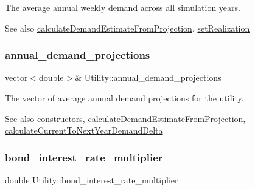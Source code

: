 The average annual weekly demand across all simulation years. 

\begin{DoxySeeAlso}{See also}
\mbox{\hyperlink{classUtility_a10f96b2f34ba7e6e12a8e8fb98b8534a}{calculate\+Demand\+Estimate\+From\+Projection}}, \mbox{\hyperlink{classUtility_a2d41989b4154aed5c2fb99a27183ca34}{set\+Realization}} 
\end{DoxySeeAlso}
\mbox{\label{classUtility_af260b06faba5238fe33687eff5ff1570}} 
\subsubsection{\texorpdfstring{annual\+\_\+demand\+\_\+projections}{annual\_demand\_projections}}
{\footnotesize\ttfamily vector$<$double$>$\& Utility\+::annual\+\_\+demand\+\_\+projections\hspace{0.3cm}{\ttfamily [private]}}



The vector of average annual demand projections for the utility. 

\begin{DoxySeeAlso}{See also}
constructors, \mbox{\hyperlink{classUtility_a10f96b2f34ba7e6e12a8e8fb98b8534a}{calculate\+Demand\+Estimate\+From\+Projection}}, \mbox{\hyperlink{classUtility_a38381b003d13986e37757dfea683f7f9}{calculate\+Current\+To\+Next\+Year\+Demand\+Delta}} 
\end{DoxySeeAlso}
\mbox{\label{classUtility_aea57a6180aacea15cb9485c455f9c48e}} 
\subsubsection{\texorpdfstring{bond\+\_\+interest\+\_\+rate\+\_\+multiplier}{bond\_interest\_rate\_multiplier}}
{\footnotesize\ttfamily double Utility\+::bond\+\_\+interest\+\_\+rate\+\_\+multiplier\hspace{0.3cm}{\ttfamily [private]}}



